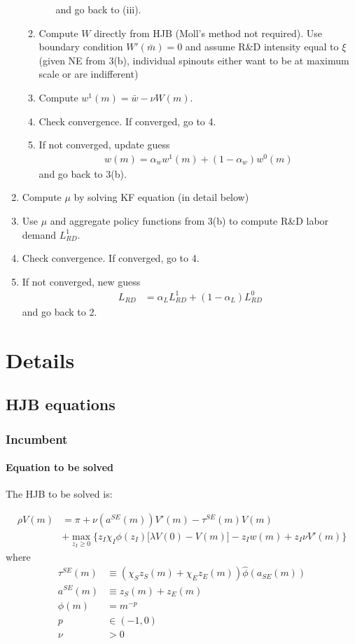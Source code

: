 \documentclass[12pt,english]{article}
\theoremstyle{remark}
\begin{document}
\begin{enumerate}
\begin{enumerate}
\begin{enumerate}
			and go back to (iii). 
		\end{enumerate} 
		\item Compute $W$ directly from HJB (Moll's method not required). Use boundary condition $W'(\bar{m}) = 0$ and assume R\&D intensity equal to $\xi$ (given NE from 3(b), individual spinouts either want to be at maximum scale or are indifferent)
		\item Compute $w^1(m) =  \bar{w} - \nu W(m)$.
		\item Check convergence. If converged, go to 4. 
		\item If not converged, update guess 
		\begin{align*}
			w(m) = \alpha_w w^1(m) + (1-\alpha_w) w^0 (m) 
		\end{align*} 
		and go back to 3(b).
	\end{enumerate}
	\item Compute $\mu$ by solving KF equation (in detail below) 
	\item Use $\mu$ and aggregate policy functions from 3(b) to compute R\&D labor demand $L^1_{RD}$.
	\item Check convergence. If converged, go to 4. 
	\item If not converged, new guess
	\begin{align*}
	L_{RD} &= \alpha_L L^1_{RD} + (1-\alpha_L) L^0_{RD} 
	\end{align*}
	and go back to 2. 
\end{enumerate}

\section{Details}

\subsection{HJB equations}

\subsubsection{Incumbent}

\paragraph{Equation to be solved}The HJB to be solved is: 

\begin{align*}
	\rho V(m) &= \pi + \nu (a^{SE}(m))V'(m) - \tau^{SE}(m) V(m) \\
							   &+ \max_{z_I \ge 0} \Big\{ z_I \chi_I \phi(z_I) \big[ \lambda V(0) - V(m) \big] - z_I w(m) + z_I \nu  V'(m) \Big\}
\end{align*}
where
\begin{align*}
	\tau^{SE}(m) &\equiv (\chi_S z_S(m) + \chi_E z_E(m)) \hat{\phi}(a_{SE}(m)) \\
	a^{SE}(m) &\equiv z_S(m) + z_E(m) \\
	\phi(m) &= m^{-p} \\
	p &\in (-1,0) \\
	\nu &> 0
\end{align*}
\end{document}
